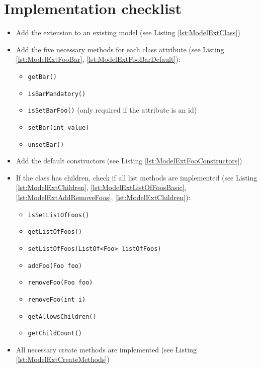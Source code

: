 \section{Implementation checklist}
    \begin{itemize}
      \renewcommand{\labelitemi}{$\Box$}
      \renewcommand{\labelitemii}{$\Box$}
        \item Add the extension to an existing model (see Listing \ref{lst:ModelExtClass})
        \item Add the five necessary methods for each class attribute (see Listing \ref{lst:ModelExtFooBar}, \ref{lst:ModelExtFooBarDefault}):
            \begin{itemize}
              \item \texttt{getBar()}
              \item \texttt{isBarMandatory()}
              \item \texttt{isSetBarFoo()} (only required if the attribute is an id)
              \item \texttt{setBar(int value)}
              \item \texttt{unsetBar()}
            \end{itemize}
        \item Add the default constructors (see Listing \ref{lst:ModelExtFooConstructors})
        \item If the class has children, check if all list methods are implemented (see Listing \ref{lst:ModelExtChildren}, \ref{lst:ModelExtListOfFoosBasic}, \ref{lst:ModelExtAddRemoveFoos}, \ref{lst:ModelExtChildren}):
            \begin{itemize}
              \item \texttt{isSetListOfFoos()}
              \item \texttt{getListOfFoos()}
              \item \texttt{setListOfFoos(ListOf<Foo> listOfFoos)}
              \item \texttt{addFoo(Foo foo)}
              \item \texttt{removeFoo(Foo foo)}
              \item \texttt{removeFoo(int i)}
              \item \texttt{getAllowsChildren()}
              \item \texttt{getChildCount()}
            \end{itemize}
        \item All necessary create methods are implemented (see Listing \ref{lst:ModelExtCreateMethods})

\end{itemize}
